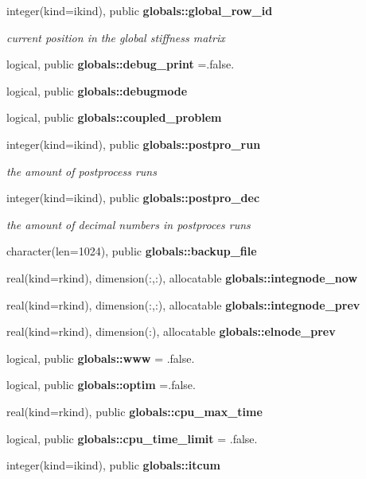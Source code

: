 \begin{DoxyCompactItemize}
integer(kind=ikind), public {\bf globals\+::global\+\_\+row\+\_\+id}
\begin{DoxyCompactList}\small\item\em current position in the global stiffness matrix \end{DoxyCompactList}\item 
logical, public {\bf globals\+::debug\+\_\+print} =.false.
\item 
logical, public {\bf globals\+::debugmode}
\item 
logical, public {\bf globals\+::coupled\+\_\+problem}
\item 
integer(kind=ikind), public {\bf globals\+::postpro\+\_\+run}
\begin{DoxyCompactList}\small\item\em the amount of postprocess runs \end{DoxyCompactList}\item 
integer(kind=ikind), public {\bf globals\+::postpro\+\_\+dec}
\begin{DoxyCompactList}\small\item\em the amount of decimal numbers in postproces runs \end{DoxyCompactList}\item 
character(len=1024), public {\bf globals\+::backup\+\_\+file}
\item 
real(kind=rkind), dimension(\+:,\+:), allocatable {\bf globals\+::integnode\+\_\+now}
\item 
real(kind=rkind), dimension(\+:,\+:), allocatable {\bf globals\+::integnode\+\_\+prev}
\item 
real(kind=rkind), dimension(\+:), allocatable {\bf globals\+::elnode\+\_\+prev}
\item 
logical, public {\bf globals\+::www} = .false.
\item 
logical, public {\bf globals\+::optim} =.false.
\item 
real(kind=rkind), public {\bf globals\+::cpu\+\_\+max\+\_\+time}
\item 
logical, public {\bf globals\+::cpu\+\_\+time\+\_\+limit} = .false.
\item 
integer(kind=ikind), public {\bf globals\+::itcum}
\end{DoxyCompactItemize}

